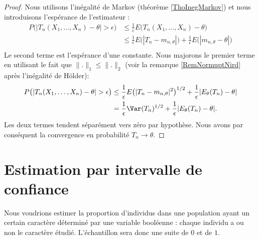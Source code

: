 \begin{proof}
    Nous utilisons l'inégalité de Markov (théorème \ref{ThoInegMarkov}) et nous introduisons l'espérance de l'estimateur :
    \begin{subequations}
        \begin{align}
            P\big( | T_n(X_1,\ldots ,X_n)-\theta |>\epsilon \big)&\leq\frac{1}{ \epsilon }E\big( T_n(X_1,\ldots,X_n)-\theta \big)\\
            &\leq \frac{1}{ \epsilon }E\big( | T_n-m_{n,\theta} | \big)+\frac{1}{ \epsilon }E\big(| m_{n,\theta}-\theta |\big)\\
        \end{align}
    \end{subequations}
    Le second terme est l'espérance d'une constante. Nous majorons le premier terme en utilisant le fait que \( \| . \|_1\leq\| . \|_2\) (voir la remarque \ref{RemNormuptNird} après l'inégalité de Hölder):
    \begin{subequations}
        \begin{align}
            P\big( | T_n(X_1,\ldots ,X_n)-\theta |>\epsilon \big)&\leq \frac{1}{ \epsilon }E\big( | T_n-m_{n,\theta} |^2 \big)^{1/2}+\frac{1}{ \epsilon }| E_{\theta}(T_n)-\theta |\\
            &=\frac{1}{ \epsilon }\Var(T_n)^{1/2}+\frac{1}{ \epsilon }| E_{\theta}(T_n)-\theta |.
        \end{align}
    \end{subequations}
    Les deux termes tendent séparément vers zéro par hypothèse. Nous avons par conséquent la convergence en probabilité \( T_n\to \theta\).
\end{proof}

\section{Estimation par intervalle de confiance}

Nous voudrions estimer la proportion d'individus dans une population ayant un certain caractère déterminé par une variable booléenne : chaque individu a ou non le caractère étudié. L'échantillon sera donc une suite de \( 0\) et de \( 1\).

